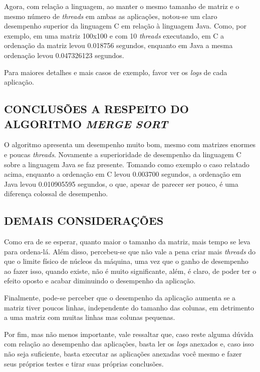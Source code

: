 		Agora, com relação a linguagem, ao manter o mesmo tamanho de matriz e o mesmo número de \textit{threads} em ambas as aplicações, notou-se um claro desempenho superior da linguagem C em relação à linguagem Java. Como, por exemplo, em uma matriz 100x100 e com 10 \textit{threads} executando, em C a ordenação da matriz levou 0.018756 segundos, enquanto em Java a mesma ordenação levou 0.047326123 segundos. 
		
		Para maiores detalhes e mais casos de exemplo, favor ver os \textit{logs} de cada aplicação.
		
	\subsection{\normalsize CONCLUSÕES A RESPEITO DO ALGORITMO \textit{MERGE SORT}}
		O algoritmo apresenta um desempenho muito bom, mesmo com matrizes enormes e poucas \textit{threads}. Novamente a superioridade de desempenho da linguagem C sobre a linguagem Java se faz presente. Tomando como exemplo o caso relatado acima, enquanto a ordenação em C levou 0.003700 segundos, a ordenação em Java levou 0.010905595 segundos, o que, apesar de parecer ser pouco, é uma diferença colossal de desempenho.
		
	\subsection{\normalsize DEMAIS CONSIDERAÇÕES}
		Como era de se esperar, quanto maior o tamanho da matriz, mais tempo se leva para ordena-lá. Além disso, percebeu-se que não vale a pena criar mais \textit{threads} do que o limite físico de núcleos da máquina, uma vez que o ganho de desempenho ao fazer isso, quando existe, não é muito significante, além, é claro, de poder ter o efeito oposto e acabar diminuindo o desempenho da aplicação.
		
		Finalmente, pode-se perceber que o desempenho da aplicação aumenta se a matriz tiver poucos linhas, independente do tamanho das colunas, em detrimento a uma matriz com muitas linhas mas colunas pequenas.
		
		Por fim, mas não menos importante, vale ressaltar que, caso reste alguma dúvida com relação ao desempenho das aplicações, basta ler os \textit{logs} anexados e, caso isso não seja suficiente, basta executar as aplicações anexadas você mesmo e fazer seus próprios testes e tirar suas próprias conclusões.